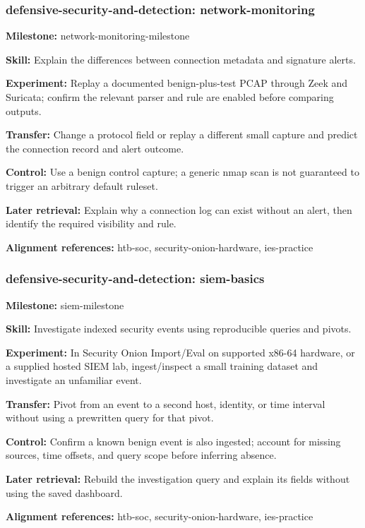 \subsubsection{defensive-security-and-detection: network-monitoring}
\noindent\textbf{Milestone:} network-monitoring-milestone\par
\noindent\textbf{Skill:} Explain the differences between connection metadata and signature alerts.\par
\noindent\textbf{Experiment:} Replay a documented benign-plus-test PCAP through Zeek and Suricata; confirm the relevant parser and rule are enabled before comparing outputs.\par
\noindent\textbf{Transfer:} Change a protocol field or replay a different small capture and predict the connection record and alert outcome.\par
\noindent\textbf{Control:} Use a benign control capture; a generic nmap scan is not guaranteed to trigger an arbitrary default ruleset.\par
\noindent\textbf{Later retrieval:} Explain why a connection log can exist without an alert, then identify the required visibility and rule.\par
\noindent\textbf{Alignment references:} htb-soc, security-onion-hardware, ies-practice\par
\subsubsection{defensive-security-and-detection: siem-basics}
\noindent\textbf{Milestone:} siem-milestone\par
\noindent\textbf{Skill:} Investigate indexed security events using reproducible queries and pivots.\par
\noindent\textbf{Experiment:} In Security Onion Import/Eval on supported x86-64 hardware, or a supplied hosted SIEM lab, ingest/inspect a small training dataset and investigate an unfamiliar event.\par
\noindent\textbf{Transfer:} Pivot from an event to a second host, identity, or time interval without using a prewritten query for that pivot.\par
\noindent\textbf{Control:} Confirm a known benign event is also ingested; account for missing sources, time offsets, and query scope before inferring absence.\par
\noindent\textbf{Later retrieval:} Rebuild the investigation query and explain its fields without using the saved dashboard.\par
\noindent\textbf{Alignment references:} htb-soc, security-onion-hardware, ies-practice\par
